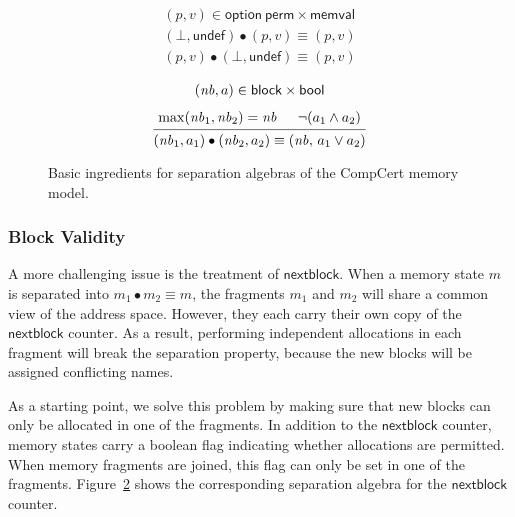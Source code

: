 \documentclass[acmsmall,screen,review,anonymous,nonacm]{acmart}
\newcommand{\kw}[1]{\ensuremath{ \mathsf{#1} }}
\begin{document}
\begin{figure}
  \begin{subfigure}{0.45\textwidth}
    \centering
    \fbox{$J_\kw{contents}$}
    \begin{gather*}
      (p, v) \in \kw{option}\ \kw{perm} \times \kw{memval} \\[1ex]
      (\bot, \kw{undef}) \bullet (p, v) \equiv (p, v) \\
      (p, v) \bullet (\bot, \kw{undef}) \equiv (p, v)
    \end{gather*}
    \label{fig:sepdef:contents}
  \end{subfigure}
  \begin{subfigure}{0.45\textwidth}
    \centering
    \fbox{$J_\kw{nextblock}$}
    \begin{gather*}
      (\mathit{nb}, a) \in \kw{block} \times \kw{bool}
      \\[1ex]
     {\begin{prooftree}
	\hypo{\mathrm{max}(\mathit{nb}_1, \mathit{nb}_2) = \mathit{nb}}
	\hypo{\lnot (a_1 \wedge a_2)}
	\infer2{(\mathit{nb}_1, a_1) \bullet (\mathit{nb}_2, a_2) \equiv
	  (\mathit{nb},\, a_1 \mathbin\vee a_2)}
      \end{prooftree}}
    \end{gather*}
    \label{fig:sepdef:fresh}
  \end{subfigure}
  \caption{%
    Basic ingredients for separation algebras
    of the CompCert memory model.}
  \label{fig:sepdef}
\end{figure}

\subsubsection{Block Validity}

A more challenging issue is the treatment of $\kw{nextblock}$.
When a memory state $m$ is separated into $m_1 \bullet m_2 \equiv m$,
the fragments $m_1$ and $m_2$ will share a common view of the address space.
However,
they each carry their own copy of the $\kw{nextblock}$ counter.
As a result,
performing independent allocations in each fragment
will break the separation property,
because the new blocks will be assigned conflicting names.

As a starting point,
we solve this problem by
making sure that new blocks
can only be allocated in one of the fragments.
In addition to the $\kw{nextblock}$ counter,
memory states carry a boolean flag
indicating whether allocations are permitted.
When memory fragments are joined,
this flag can only be set in one of the fragments.
Figure~\ref{fig:sepdef:fresh}
shows the corresponding separation algebra
for the $\kw{nextblock}$ counter.
\end{document}
